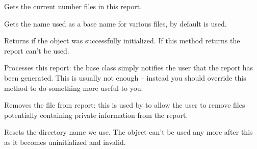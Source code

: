 \label{wxdebugreportgetfilescount}


Gets the current number files in this report.


\label{wxdebugreportgetreportname}


Gets the name used as a base name for various files, by default 
 is used.


\label{wxdebugreportisok}


Returns \true if the object was successfully initialized. If this method returns 
\false the report can't be used.


\label{wxdebugreportprocess}


Processes this report: the base class simply notifies the user that the
report has been generated. This is usually not enough -- instead you
should override this method to do something more useful to you.


\label{wxdebugreportremovefile}


Removes the file from report: this is used by 
 to allow the user to
remove files potentially containing private information from the report.


\label{wxdebugreportreset}


Resets the directory name we use. The object can't be used any more after
this as it becomes uninitialized and invalid.

